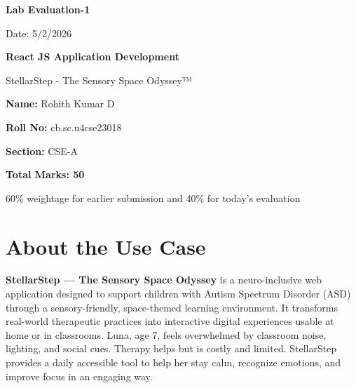 \documentclass[11pt,a4paper]{article}
\begin{document}
\begin{titlepage}
    \centering
    \vspace*{2cm}
    
    {\Huge\bfseries Lab Evaluation-1\par}
    \vspace{0.8cm}
    {\Large Date: 5/2/2026\par}
    \vspace{2cm}
    
    {\LARGE\textbf{React JS Application Development}\par}
    \vspace{0.5cm}
    {\Large StellarStep - The Sensory Space Odyssey™\par}
    \vspace{3cm}
    
    {\Large \textbf{Name:} Rohith Kumar D\par}
    \vspace{0.3cm}
    {\Large \textbf{Roll No:} cb.sc.u4cse23018\par}
    \vspace{0.3cm}
    {\Large \textbf{Section:} CSE-A\par}
    \vspace{3cm}
    
    {\large\textbf{Total Marks: 50}\par}
    \vspace{0.3cm}
    {\normalsize 60\% weightage for earlier submission and 40\% for today's evaluation\par}
    
    \vfill
    
\end{titlepage}

\newpage

\section{About the Use Case}

\textbf{StellarStep --- The Sensory Space Odyssey\texttrademark} is a neuro-inclusive web application designed to support children with Autism Spectrum Disorder (ASD) through a sensory-friendly, space-themed learning environment. It transforms real-world therapeutic practices into interactive digital experiences usable at home or in classrooms. Luna, age 7, feels overwhelmed by classroom noise, lighting, and social cues. Therapy helps but is costly and limited. StellarStep provides a daily accessible tool to help her stay calm, recognize emotions, and improve focus in an engaging way.
\end{document}
